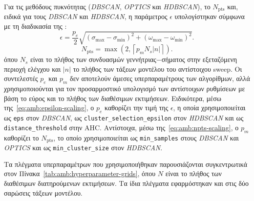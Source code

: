 Για τις μεθόδους πυκνότητας (\textenglish{\textit{DBSCAN}}, \textenglish{\textit{OPTICS}} και
\textenglish{\textit{HDBSCAN}}), το $N_{\mathrm{pts}}$ και, ειδικά για τους \textenglish{\textit{DBSCAN}} και \textenglish{\textit{HDBSCAN}}, η παράμετρος $\epsilon$
υπολογίστηκαν σύμφωνα με τη διαδικασία της
\cite{sfetkos2024measurement}:
\begin{equation}
\epsilon =
\frac{p_e}{2}
\sqrt{(\sigma_{\max}-\sigma_{\min})^2+
    (\omega_{\max}-\omega_{\min})^2}.
\label{eq:amb:epsilon-scaling}
\end{equation}
\begin{equation}
N_{\mathrm{pts}}=
\max\left(2,\left\lceil p_m N_s|n|\right\rceil\right).
\label{eq:amb:npts-scaling}
\end{equation}
όπου $N_s$ είναι το πλήθος των συνδυασμών γεννήτριας$-$σήματος στην
εξεταζόμενη περιοχή ελέγχου και $|n|$ το πλήθος των τάξεων μοντέλου του
αντίστοιχου sweep. Οι συντελεστές $p_e$ και $p_m$ δεν αποτελούν άμεσες
υπερπαραμέτρους των αλγορίθμων, αλλά χρησιμοποιούνται για τον προσαρμοστικό
υπολογισμό των αντίστοιχων ρυθμίσεων με βάση το εύρος και το πλήθος των
διαθέσιμων εκτιμήσεων. Ειδικότερα, μέσω της~\eqref{eq:amb:epsilon-scaling},
ο $p_e$ καθορίζει την τιμή της $\epsilon$, η οποία χρησιμοποιείται ως
\texttt{eps} στον \textenglish{\textit{DBSCAN}}, ως
\texttt{cluster\_selection\_epsilon} στον \textenglish{\textit{HDBSCAN}}
και ως \texttt{distance\_threshold} στην AHC. Αντίστοιχα, μέσω
της~\eqref{eq:amb:npts-scaling}, ο $p_m$ καθορίζει το $N_{\mathrm{pts}}$,
το οποίο χρησιμοποιείται ως \texttt{min\_samples} στους
\textenglish{\textit{DBSCAN}} και \textenglish{\textit{OPTICS}} και ως
\texttt{min\_cluster\_size} στον \textenglish{\textit{HDBSCAN}}.

Τα πλέγματα υπερπαραμέτρων που χρησιμοποιήθηκαν
παρουσιάζονται συγκεντρωτικά στον Πίνακα~\ref{tab:amb:hyperparameter-grids},
όπου $N$ είναι το πλήθος των διαθέσιμων διατηρούμενων εκτιμήσεων. Τα ίδια
πλέγματα εφαρμόστηκαν και στις δύο σαρώσεις τάξεων μοντέλου.

